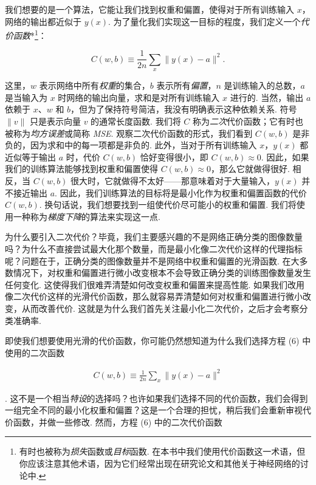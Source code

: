 我们想要的是一个算法，它能让我们找到权重和偏置，使得对于所有训练输入 $x$，网络的输出都近似于 $y(x)$. 为了量化我们实现这一目标的程度，我们定义一个\emph{代价函数}*\footnote{有时也被称为\emph{损失}函数或\emph{目标}函数. 在本书中我们使用代价函数这一术语，但你应该注意其他术语，因为它们经常出现在研究论文和其他关于神经网络的讨论中.}：

\begin{equation}
C(w,b) \equiv \frac{1}{2n} \sum_x \| y(x) - a\|^2.
\tag{6}
\end{equation}

\noindent 这里，$w$ 表示网络中所有\emph{权重}的集合，$b$ 表示所有\emph{偏置}，$n$ 是训练输入的总数，$a$ 是当输入为 $x$ 时网络的输出向量，求和是对所有训练输入 $x$ 进行的. 当然，输出 $a$ 依赖于 $x$、$w$ 和 $b$，但为了保持符号简洁，我没有明确表示这种依赖关系. 符号 $\| v \|$ 只是表示向量 $v$ 的通常长度函数. 我们将 $C$ 称为\emph{二次}代价函数\label{term:32}；它有时也被称为\emph{均方误差}或简称 \emph{MSE}. 观察二次代价\label{term:33}函数的形式，我们看到 $C(w,b)$ 是非负的，因为求和中的每一项都是非负的. 此外，当对于所有训练输入 $x$，$y(x)$ 都近似等于输出 $a$ 时，代价 $C(w,b)$ 恰好变得很小，即 $C(w,b) \approx 0$. 因此，如果我们的训练算法\label{term:34}能够找到权重和偏置使得 $C(w,b) \approx 0$，那么它就做得很好. 相反，当 $C(w,b)$ 很大时，它就做得不太好——那意味着对于大量输入，$y(x)$ 并不接近输出 $a$. 因此，我们训练算法的目标将是最小化作为权重和偏置函数的代价 $C(w,b)$. 换句话说，我们想要找到一组使代价尽可能小的权重和偏置. 我们将使用一种称为\emph{梯度下降}的算法来实现这一点.

为什么要引入二次代价？毕竟，我们主要感兴趣的不是网络正确分类的图像数量吗？为什么不直接尝试最大化那个数量，而是最小化像二次代价这样的代理指标呢？问题在于，正确分类的图像数量并不是网络中权重和偏置的光滑函数. 在大多数情况下，对权重和偏置进行微小改变根本不会导致正确分类的训练图像数量发生任何变化. 这使得我们很难弄清楚如何改变权重和偏置来提高性能. 如果我们改用像二次代价这样的光滑代价函数，那么就容易弄清楚如何对权重和偏置进行微小改变，从而改善代价. 这就是为什么我们首先关注最小化二次代价，之后才会考察分类准确率.

即使我们想要使用光滑的代价函数，你可能仍然想知道为什么我们选择方程 (6) 中使用的二次函数

\begin{align*}
C(w,b) \equiv \frac{1}{2n} \sum_x \| y(x) - a\|^2 \nonumber
\end{align*}

\noindent. 这不是一个相当\emph{特设}的选择吗？也许如果我们选择不同的代价函数，我们会得到一组完全不同的最小化权重和偏置？这是一个合理的担忧，稍后我们会重新审视代价函数，并做一些修改. 然而，方程 (6) 中的二次代价函数

